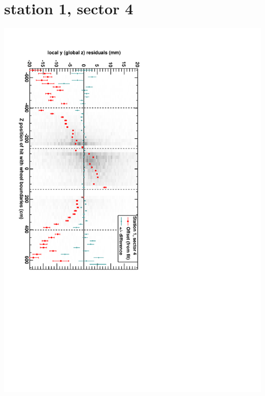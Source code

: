 \documentclass[compress]{beamer}
\begin{document}
\section*{station 1, sector 4}
\begin{frame} \vfill \mbox{\hspace{-1 cm}\includegraphics[height=1.2\linewidth, angle=90]{DTzVsZ_st1_sr04.pdf}} \end{frame}
\end{document}
